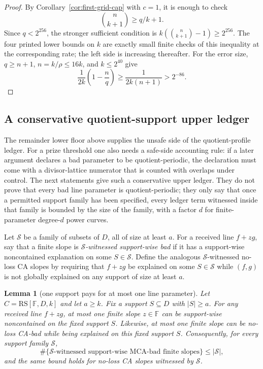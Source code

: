 \documentclass[11pt]{article}
\newtheorem{lemma}[theorem]{Lemma}
\theoremstyle{definition}
\theoremstyle{remark}
\newcommand{\F}{\mathbb{F}}
\newcommand{\RS}{\mathrm{RS}}
\begin{document}
\begin{proof}
By Corollary~\ref{cor:first-grid-cap} with $c=1$, it is enough to check
\[
        \binom n{k+1}\ge q/k+1.
\]
Since $q<2^{256}$, the stronger sufficient condition is
$k(\binom n{k+1}-1)\ge2^{256}$.  The four printed lower bounds on $k$ are exactly
small finite checks of this inequality at the corresponding rate; the left side
is increasing thereafter.  For the error size, $q\ge n+1$, $n=k/\rho\le16k$,
and $k\le2^{40}$ give
\[
        \frac1{2k}\left(1-\frac nq\right)
        \ge \frac1{2k(n+1)}
        >2^{-86}.
\]
\end{proof}


\subsection{A conservative quotient-support upper ledger}
\label{sec:quotient-support-upper}

The remainder lower floor above supplies the unsafe side of the quotient-profile
ledger.  For a prize threshold one also needs a safe-side accounting rule: if a
later argument declares a bad parameter to be quotient-periodic, the declaration
must come with a divisor-lattice numerator that is counted with overlaps under
control.  The next statements give such a conservative upper ledger.  They do
not prove that every bad line parameter is quotient-periodic; they only say that
once a permitted support family has been specified, every ledger term witnessed
inside that family is bounded by the size of the family, with a factor $d$ for
finite-parameter degree-$d$ power curves.

Let $\mathcal S$ be a family of subsets of $D$, all of size at least $a$.  For a
received line $f+zg$, say that a finite slope is
\emph{$\mathcal S$-witnessed support-wise bad} if it has a support-wise
noncontained explanation on some $S\in\mathcal S$.  Define the analogous
$\mathcal S$-witnessed no-loss CA slopes by requiring that $f+zg$ be explained
on some $S\in\mathcal S$ while $(f,g)$ is not globally explained on any support
of size at least $a$.

\begin{lemma}[one support pays for at most one line parameter]
\label{lem:one-support-one-line}
Let $C=\RS[\F,D,k]$ and let $a\ge k$.  Fix a support
$S\subseteq D$ with $|S|\ge a$.  For any received line $f+zg$, at most one finite
slope $z\in\F$ can be support-wise noncontained on the fixed support $S$.
Likewise, at most one finite slope can be no-loss CA-bad while being explained on
this fixed support $S$.  Consequently, for every support family $\mathcal S$,
\[
        \#\{\mathcal S\text{-witnessed support-wise MCA-bad finite slopes}\}
        \le |\mathcal S|,
\]
and the same bound holds for no-loss CA slopes witnessed by $\mathcal S$.
\end{lemma}
\end{document}
